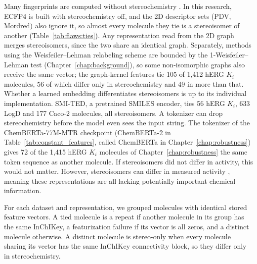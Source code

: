 Many fingerprints are computed without stereochemistry \citep{orsi2024map4c}. In this research, ECFP4 is built with stereochemistry off, and the 2D descriptor sets (PDV, Mordred) also ignore it, so almost every molecule they tie is a stereoisomer of another (Table~\ref{tab:flaws:ties}). Any representation read from the 2D graph merges stereoisomers, since the two share an identical graph. Separately, methods using the Weisfeiler--Lehman relabeling scheme are bounded by the 1-Weisfeiler--Lehman test (Chapter~\ref{chap:background}), so some non-isomorphic graphs also receive the same vector; the graph-kernel features tie 105 of 1,412 hERG $K_i$ molecules, 56 of which differ only in stereochemistry and 49 in more than that. Whether a learned embedding differentiates stereoisomers is up to its individual implementation. SMI-TED, a pretrained SMILES encoder, ties 56 hERG $K_i$, 633 LogD and 177 Caco-2 molecules, all stereoisomers. A tokenizer can drop stereochemistry before the model even sees the input string. The tokenizer of the ChemBERTa-77M-MTR checkpoint (ChemBERTa-2 in Table~\ref{tab:constant_features}, called ChemBERTa in Chapter~\ref{chap:robustness}) gives 72 of the 1,415 hERG $K_i$ molecules of Chapter~\ref{chap:robustness} the same token sequence as another molecule. If stereoisomers did not differ in activity, this would not matter. However, stereoisomers can differ in measured activity \citep{Nguyen2006}, meaning these representations are all lacking potentially important chemical information.

For each dataset and representation, we grouped molecules with identical stored feature vectors. A tied molecule is a repeat if another molecule in its group has the same InChIKey, a featurization failure if its vector is all zeros, and a distinct molecule otherwise. A distinct molecule is stereo-only when every molecule sharing its vector has the same InChIKey connectivity block, so they differ only in stereochemistry.

